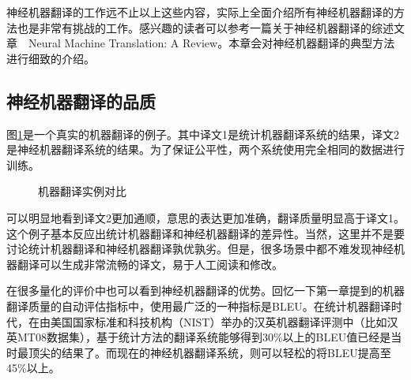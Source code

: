 \parinterval  神经机器翻译的工作远不止以上这些内容，实际上全面介绍所有神经机器翻译的方法也是非常有挑战的工作。感兴趣的读者可以参考一篇关于神经机器翻译的综述文章\ \dash\ Neural Machine Translation: A Review\cite{StahlbergNeural}。本章会对神经机器翻译的典型方法进行细致的介绍。


\subsection{神经机器翻译的品质 }
\vspace{0.3em}
\parinterval  图\ref{fig:6-2}是一个真实的机器翻译的例子。其中译文1是统计机器翻译系统的结果，译文2是神经机器翻译系统的结果。为了保证公平性，两个系统使用完全相同的数据进行训练。

\begin{figure}[htp]
\centering

\setlength{\abovecaptionskip}{-0.2cm}
\end{figure}

\begin{figure}[htp]
\centering

\setlength{\abovecaptionskip}{-0.2em}
\caption{机器翻译实例对比}
\label{fig:6-2}
\end{figure}
%

\vspace{-0.3em}
\parinterval  可以明显地看到译文2更加通顺，意思的表达更加准确，翻译质量明显高于译文1。这个例子基本反应出统计机器翻译和神经机器翻译的差异性。当然，这里并不是要讨论统计机器翻译和神经机器翻译孰优孰劣。但是，很多场景中都不难发现神经机器翻译可以生成非常流畅的译文，易于人工阅读和修改。

\parinterval  在很多量化的评价中也可以看到神经机器翻译的优势。回忆一下第一章提到的机器翻译质量的自动评估指标中，使用最广泛的一种指标是BLEU。在统计机器翻译时代，在由美国国家标准和科技机构（NIST）举办的汉英机器翻译评测中（比如汉英MT08数据集），基于统计方法的翻译系统能够得到30\%以上的BLEU值已经是当时最顶尖的结果了。而现在的神经机器翻译系统，则可以轻松的将BLEU提高至45\%以上。

